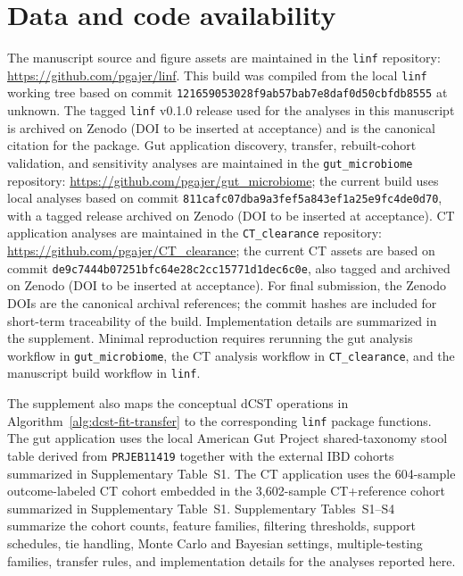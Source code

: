 \documentclass[11pt]{article}
\providecommand{\manuscriptbuilddatetime}{unknown}
\begin{document}
\section{Data and code availability}

The manuscript source and figure assets are maintained in the
\texttt{linf} repository: \url{https://github.com/pgajer/linf}. This build was
compiled from the local \texttt{linf} working tree based on commit
\texttt{121659053028f9ab57bab7e8daf0d50cbfdb8555} at \manuscriptbuilddatetime.
The tagged \texttt{linf} v0.1.0 release used for the analyses in this
manuscript is archived on Zenodo (DOI to be inserted at acceptance) and
is the canonical citation for the package. Gut
application discovery, transfer, rebuilt-cohort validation, and sensitivity
analyses are maintained in the \texttt{gut\_microbiome}
repository: \url{https://github.com/pgajer/gut_microbiome}; the current build
uses local analyses based on commit
\texttt{811cafc07dba9a3fef5a843ef1a25e9fc4de0d70}, with a tagged release
archived on Zenodo (DOI to be inserted at acceptance). CT application
analyses are maintained in the \texttt{CT\_clearance} repository:
\url{https://github.com/pgajer/CT_clearance}; the current CT assets are based on
commit \texttt{de9c7444b07251bfc64e28c2cc15771d1dec6c0e}, also tagged and
archived on Zenodo (DOI to be inserted at acceptance). For final submission,
the Zenodo DOIs are the canonical archival references; the commit hashes are
included for short-term traceability of the build. Implementation
details are summarized in the supplement.
Minimal reproduction requires rerunning the gut analysis workflow in
\texttt{gut\_microbiome}, the CT analysis workflow in
\texttt{CT\_clearance}, and the manuscript build workflow in \texttt{linf}.

The supplement also maps the conceptual dCST operations in
Algorithm~\ref{alg:dcst-fit-transfer} to the corresponding \texttt{linf}
package functions. The gut application uses the local American Gut Project
shared-taxonomy stool
table derived from \texttt{PRJEB11419} together with the external IBD cohorts
summarized in Supplementary Table~S1. The CT application uses
the 604-sample outcome-labeled CT cohort embedded in the 3,602-sample
CT+reference cohort summarized in Supplementary Table~S1. Supplementary
Tables~S1--S4 summarize the cohort counts, feature families, filtering
thresholds, support schedules, tie handling, Monte Carlo and Bayesian settings,
multiple-testing families, transfer rules, and implementation details for the
analyses reported here.
\end{document}
